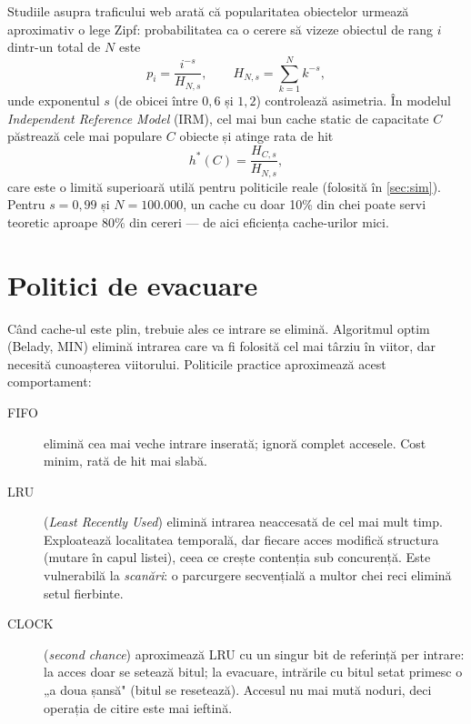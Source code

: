 Studiile asupra traficului web \cite{breslau} arată că popularitatea obiectelor urmează aproximativ o
lege Zipf: probabilitatea ca o cerere să vizeze obiectul de rang $i$ dintr-un total de $N$ este
\begin{equation}
  p_i = \frac{i^{-s}}{H_{N,s}}, \qquad H_{N,s} = \sum_{k=1}^{N} k^{-s},
\end{equation}
unde exponentul $s$ (de obicei între $0{,}6$ și $1{,}2$) controlează asimetria. În modelul
\emph{Independent Reference Model} (IRM), cel mai bun cache static de capacitate $C$ păstrează cele
mai populare $C$ obiecte și atinge rata de hit
\begin{equation}
  h^{*}(C) = \frac{H_{C,s}}{H_{N,s}},
  \label{eq:ideal}
\end{equation}
care este o limită superioară utilă pentru politicile reale (folosită în \cref{sec:sim}). Pentru
$s = 0{,}99$ și $N = 100.000$, un cache cu doar 10\% din chei poate servi teoretic aproape 80\% din
cereri — de aici eficiența cache-urilor mici.

\section{Politici de evacuare}

Când cache-ul este plin, trebuie ales ce intrare se elimină. Algoritmul optim (Belady, MIN)
\cite{belady} elimină intrarea care va fi folosită cel mai târziu în viitor, dar necesită cunoașterea
viitorului. Politicile practice aproximează acest comportament:

\begin{description}
  \item[FIFO] elimină cea mai veche intrare inserată; ignoră complet accesele. Cost minim, rată de hit
        mai slabă.
  \item[LRU] (\emph{Least Recently Used}) elimină intrarea neaccesată de cel mai mult timp. Exploatează
        localitatea temporală, dar fiecare acces modifică structura (mutare în capul listei), ceea ce
        crește contenția sub concurență. Este vulnerabilă la \emph{scanări}: o parcurgere secvențială a
        multor chei reci elimină setul fierbinte.
  \item[CLOCK] (\emph{second chance}) \cite{corbato} aproximează LRU cu un singur bit de referință per
        intrare: la acces doar se setează bitul; la evacuare, intrările cu bitul setat primesc o „a doua
        șansă" (bitul se resetează). Accesul nu mai mută noduri, deci operația de citire este mai ieftină.
\end{description}

